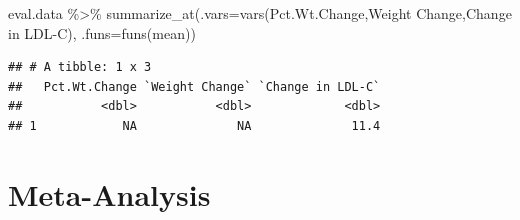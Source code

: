 \documentclass[
]{article}
\newenvironment{Shaded}{\begin{snugshade}}{\end{snugshade}}
\newcommand{\AttributeTok}[1]{\textcolor[rgb]{0.77,0.63,0.00}{#1}}
\newcommand{\FunctionTok}[1]{\textcolor[rgb]{0.00,0.00,0.00}{#1}}
\newcommand{\NormalTok}[1]{#1}
\newcommand{\SpecialCharTok}[1]{\textcolor[rgb]{0.00,0.00,0.00}{#1}}
\newcommand{\StringTok}[1]{\textcolor[rgb]{0.31,0.60,0.02}{#1}}
\begin{document}
\begin{Shaded}
\begin{Highlighting}[]
\NormalTok{eval.data }\SpecialCharTok{\%\textgreater{}\%} 
  \FunctionTok{summarize\_at}\NormalTok{(}\AttributeTok{.vars=}\FunctionTok{vars}\NormalTok{(Pct.Wt.Change,}\StringTok{\textasciigrave{}}\AttributeTok{Weight Change}\StringTok{\textasciigrave{}}\NormalTok{,}\StringTok{\textasciigrave{}}\AttributeTok{Change in LDL{-}C}\StringTok{\textasciigrave{}}\NormalTok{),}
               \AttributeTok{.funs=}\FunctionTok{funs}\NormalTok{(mean)) }
\end{Highlighting}
\end{Shaded}

\begin{verbatim}
## # A tibble: 1 x 3
##   Pct.Wt.Change `Weight Change` `Change in LDL-C`
##           <dbl>           <dbl>             <dbl>
## 1            NA              NA              11.4
\end{verbatim}

\hypertarget{meta-analysis}{%
\section{Meta-Analysis}\label{meta-analysis}}
\end{document}
